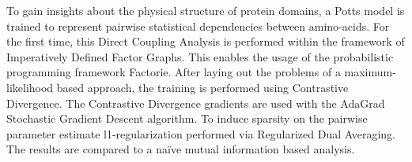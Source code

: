 To gain insights about the physical structure of protein domains, a Potts model is trained to represent pairwise statistical dependencies between amino-acids. For the first time, this Direct Coupling Analysis is performed within the framework of Imperatively Defined Factor Graphs. This enables the usage of the probabilistic programming framework Factorie. After laying out the problems of a maximum-likelihood based approach, the training is performed using Contrastive Divergence. The Contrastive Divergence gradients are used with the AdaGrad Stochastic Gradient Descent algorithm. To induce sparsity on the pairwise parameter estimate l1-regularization performed via Regularized Dual Averaging. The results are compared to a naïve mutual information based analysis.